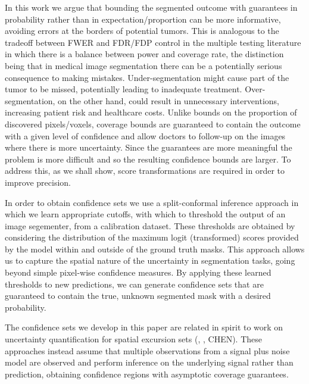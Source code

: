 In this work we argue that bounding the segmented outcome with guarantees in probability rather than in expectation/proportion can be more informative, avoiding errors at the borders of potential tumors. This is analogous to the tradeoff between FWER and FDR/FDP control in the multiple testing literature in which there is a balance between power and coverage rate, the distinction being that in medical image segmentation there can be a potentially serious consequence to making mistakes. Under-segmentation might cause part of the tumor to be missed, potentially leading to inadequate treatment. Over-segmentation, on the other hand, could result in unnecessary interventions, increasing patient risk and healthcare costs. Unlike bounds on the proportion of discovered pixels/voxels, coverage bounds are guaranteed to contain the outcome with a given level of confidence and allow doctors to follow-up on the images where there is more uncertainty. Since the guarantees are more meaningful the problem is more difficult and so the resulting confidence bounds are larger. To address this, as we shall show, score transformations are required in order to improve precision. 

In order to obtain confidence sets we use a split-conformal inference approach in which we learn appropriate cutoffs, with which to threshold the output of an image segementer, from a calibration dataset. These thresholds are obtained by considering the distribution of the maximum logit (transformed) scores provided by the model within and outside of the ground truth masks. This approach allows us to capture the spatial nature of the uncertainty in segmentation tasks, going beyond simple pixel-wise confidence measures. By applying these learned thresholds to new predictions, we can generate confidence sets that are guaranteed to contain the true, unknown segmented mask with a desired probability. 

The confidence sets we develop in this paper are related in spirit to work on uncertainty quantification for spatial excursion sets (\cite{Bowring2019}, \cite{Mejia2019}, CHEN). These approaches instead assume that multiple observations from a signal plus noise model are observed and perform inference on the underlying signal rather than prediction, obtaining confidence regions with asymptotic coverage guarantees. 

 